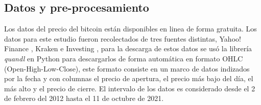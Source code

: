 \subsection{Datos y pre-procesamiento}
Los datos del precio del bitcoin están disponibles en linea de forma gratuita. Los datos para este estudio fueron recolectados de tres fuentes distintas, Yahoo! Finance \cite{YahooFinanceStock}, Kraken \cite{BitcoinCryptocurrencyExchange} e Investing \cite{InvestingComStock}, para la descarga de estos datos se usó la librería \emph{quandl} en Python para descargarlos de forma automática en formato OHLC (Open-High-Low-Close), este formato consiste en un marco de datos indizados por la fecha y con columnas el precio de apertura, el precio más bajo del día, el más alto y el precio de cierre. El intervalo de los datos es considerado desde el 2 de febrero del 2012 hasta el 11 de octubre de 2021.

